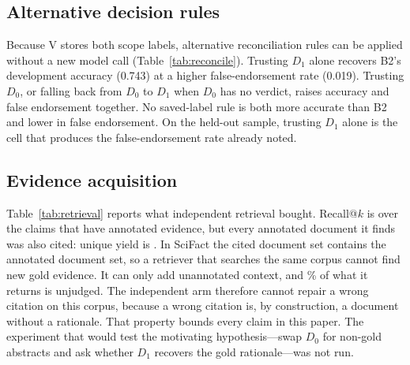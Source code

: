 \documentclass[11pt,a4paper]{article}
\newcommand{\Dzero}{\ensuremath{D_0}}
\newcommand{\Done}{\ensuremath{D_1}}
\begin{document}
\subsection{Alternative decision rules}

Because V stores both scope labels, alternative reconciliation rules can
be applied without a new model call (Table~\ref{tab:reconcile}). Trusting
\Done{} alone recovers B2's development accuracy (0.743) at a higher
false-endorsement rate (0.019). Trusting \Dzero{}, or falling back from
\Dzero{} to \Done{} when \Dzero{} has no verdict, raises accuracy and
false endorsement together. No saved-label rule is both more accurate
than B2 and lower in false endorsement. On the held-out sample, trusting
\Done{} alone is the cell that produces the \lunaheldVDOnefe{}
false-endorsement rate already noted.

\begin{table}[t]
\centering
\caption{Alternative decision rules applied to the saved per-scope
labels, on claims where both B2 and V completed. No model is called.}
\label{tab:reconcile}

\end{table}

\subsection{Evidence acquisition}

Table~\ref{tab:retrieval} reports what independent retrieval bought.
Recall@$k$ is \retrievalRecall{} over the \retrievalNAnnotated{} claims
that have annotated evidence, but every annotated document it finds was
also cited: unique yield is \retrievalUnique{}. In SciFact the cited
document set contains the annotated document set, so a retriever that
searches the same corpus cannot find new gold evidence. It can only add
unannotated context, and \retrievalUnjudged{}\% of what it returns is
unjudged. The independent arm therefore cannot repair a wrong citation
on this corpus, because a wrong citation is, by construction, a document
without a rationale. That property bounds every claim in this paper. The
experiment that would test the motivating hypothesis---swap \Dzero{} for
non-gold abstracts and ask whether \Done{} recovers the gold
rationale---was not run.

\begin{table}[t]
\centering
\caption{Evidence acquisition for the independent-retrieval arm on the
development sample.}
\label{tab:retrieval}

\end{table}
\end{document}
